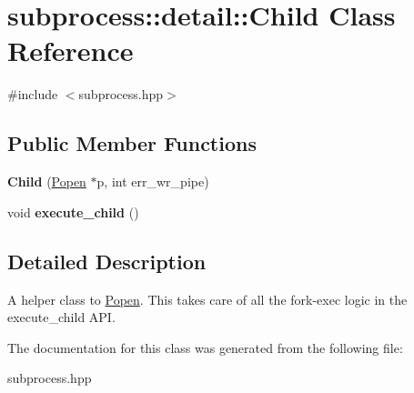 \hypertarget{classsubprocess_1_1detail_1_1Child}{}\section{subprocess\+:\+:detail\+:\+:Child Class Reference}
\label{classsubprocess_1_1detail_1_1Child}


{\ttfamily \#include $<$subprocess.\+hpp$>$}

\subsection*{Public Member Functions}
\begin{DoxyCompactItemize}
\item 
\mbox{\label{classsubprocess_1_1detail_1_1Child_a1e4106803f4d25dc35644b7af21ec9ab}} 
{\bfseries Child} (\hyperlink{classsubprocess_1_1Popen}{Popen} $\ast$p, int err\+\_\+wr\+\_\+pipe)
\item 
\mbox{\label{classsubprocess_1_1detail_1_1Child_af7c6810df35de315c85900056a95787b}} 
void {\bfseries execute\+\_\+child} ()
\end{DoxyCompactItemize}


\subsection{Detailed Description}
A helper class to \hyperlink{classsubprocess_1_1Popen}{Popen}. This takes care of all the fork-\/exec logic in the execute\+\_\+child A\+PI. 

The documentation for this class was generated from the following file\+:\begin{DoxyCompactItemize}
\item 
subprocess.\+hpp\end{DoxyCompactItemize}
